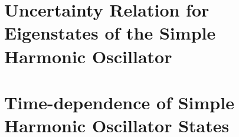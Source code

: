 \documentclass[
a4paper,
10pt,
twoside,
]{article}
\begin{document}
\section{Uncertainty Relation for Eigenstates of the Simple Harmonic Oscillator}

\section{Time-dependence of Simple Harmonic Oscillator States}
\subsection{} %
\subsection{} %
\subsection{} %

\printbib


\stopmcols
\end{document}
